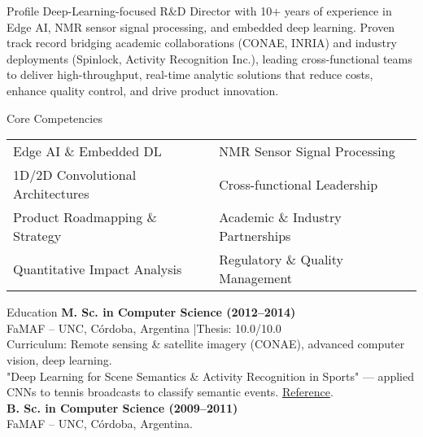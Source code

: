 \documentclass{resume}
\begin{document}
\begin{rSection}{Profile}
Deep-Learning-focused R&D Director with 10+ years of experience in Edge AI, NMR sensor signal processing, and embedded deep learning. Proven track record bridging academic collaborations (CONAE, INRIA) and industry deployments (Spinlock, Activity Recognition Inc.), leading cross-functional teams to deliver high-throughput, real-time analytic solutions that reduce costs, enhance quality control, and drive product innovation.
\end{rSection}

\begin{rSection}{Core Competencies}
\begin{tabular}{@{}p{2in}p{2in}@{}}
Edge AI \& Embedded DL & NMR Sensor Signal Processing \\
1D/2D Convolutional Architectures & Cross-functional Leadership \\
Product Roadmapping \& Strategy & Academic \& Industry Partnerships \\
Quantitative Impact Analysis & Regulatory \& Quality Management \\
\end{tabular}
\end{rSection}

\begin{rSection}{Education}
{\bf M. Sc. in Computer Science (2012--2014)} \\[-0.5ex]
FaMAF -- UNC, Córdoba, Argentina \quad|\quad Thesis: 10.0/10.0\\
Curriculum: Remote sensing \& satellite imagery (CONAE), advanced computer vision, deep learning.\\
"Deep Learning for Scene Semantics \& Activity Recognition in Sports" — applied CNNs to tennis broadcasts to classify semantic events. \href{http://repositoriosdigitales.mincyt.gob.ar/vufind/Record/RDUUNC_0aec6058e869999c7224655c3c2c98bf}{Reference}.\\[1ex]
{\bf B. Sc. in Computer Science (2009--2011)} \\[-0.5ex]
FaMAF -- UNC, Córdoba, Argentina.
\end{rSection}
\end{document}
